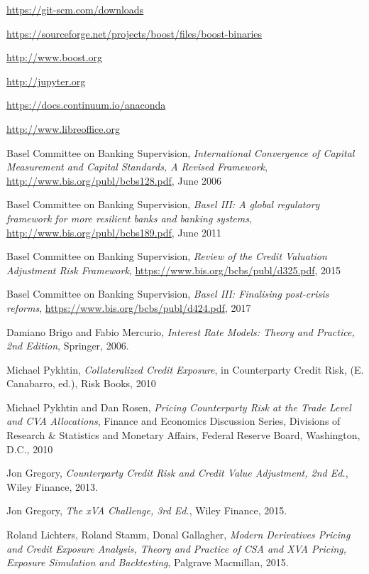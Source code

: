 \documentclass[12pt, a4paper]{article}
\begin{document}
{{\begin{thebibliography}{*}
 \url{https://git-scm.com/downloads}

 \url{https://sourceforge.net/projects/boost/files/boost-binaries}

 \url{http://www.boost.org}

 \url{http://jupyter.org}

 \url{https://docs.continuum.io/anaconda}

 \url{http://www.libreoffice.org}


 Basel Committee on Banking Supervision, {\em International Convergence of Capital Measurement and
    Capital Standards, A Revised Framework}, \url{http://www.bis.org/publ/bcbs128.pdf}, June 2006

 Basel Committee on Banking Supervision, {\em Basel III: A global regulatory framework for more
    resilient banks and banking systems}, \url{http://www.bis.org/publ/bcbs189.pdf}, June 2011

 Basel Committee on Banking Supervision, {\em Review of the Credit Valuation Adjustment Risk Framework}, \url{https://www.bis.org/bcbs/publ/d325.pdf}, 2015

 Basel Committee on Banking Supervision, {\em Basel III: Finalising post-crisis reforms}, \url{https://www.bis.org/bcbs/publ/d424.pdf}, 2017

 Damiano Brigo and Fabio Mercurio, {\em Interest Rate Models: Theory and Practice, 2nd Edition},
  Springer, 2006.

 Michael Pykhtin, {\em Collateralized Credit Exposure}, in Counterparty Credit Risk, (E. Canabarro,
  ed.), Risk Books, 2010

 Michael Pykhtin and Dan Rosen, {\em Pricing Counterparty Risk at the Trade Level and CVA
    Allocations}, Finance and Economics Discussion Series, Divisions of Research \& Statistics and Monetary Affairs,
  Federal Reserve Board, Washington, D.C., 2010

 Jon Gregory, {\em Counterparty Credit Risk and Credit Value Adjustment, 2nd Ed.}, Wiley Finance,
  2013.

 Jon Gregory, {\em The xVA Challenge, 3rd Ed.}, Wiley Finance, 2015.

 Roland Lichters, Roland Stamm, Donal Gallagher, {\em Modern Derivatives Pricing and Credit Exposure
    Analysis, Theory and Practice of CSA and XVA Pricing, Exposure Simulation and Backtesting}, Palgrave Macmillan,
  2015.


\end{thebibliography}}}
\end{document}

